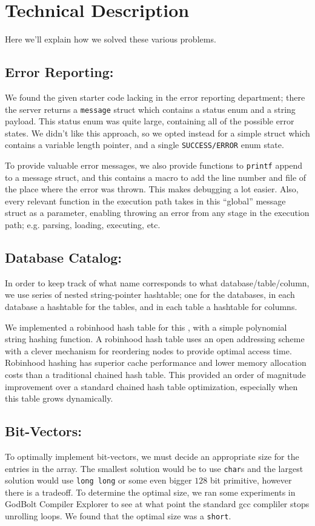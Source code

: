 \documentclass{article}
\begin{document}
\section{Technical Description}

Here we'll explain how we solved these various problems.

\subsection{Error Reporting:}
We found the given starter code lacking in the error reporting department; there the server returns a \texttt{message} struct which contains a status enum and a string payload. This status enum was quite large, containing all of the possible error states. We didn't like this approach, so we opted instead for a simple struct which contains a variable length pointer, and a single \texttt{SUCCESS/ERROR} enum state.

\medskip
To provide valuable error messages, we also provide functions to \texttt{printf} append to a message struct, and this contains a macro to add the line number and file of the place where the error was thrown. This makes debugging a lot easier. Also, every relevant function in the execution path takes in this ``global'' message struct as a parameter, enabling throwing an error from any stage in the execution path; e.g. parsing, loading, executing, etc.

\subsection{Database Catalog:}
In order to keep track of what name corresponds to what database/table/column, we use series of nested string-pointer hashtable; one for the databases, in each database a hashtable for the tables, and in each table a hashtable for columns.

\medskip
We implemented a robinhood hash table for this \cite{hash}, with a simple polynomial string hashing function. A robinhood hash table uses an open addressing scheme with a clever mechanism for reordering nodes to provide optimal access time. Robinhood hashing has superior cache performance and lower memory allocation costs than a traditional chained hash table. This provided an order of magnitude improvement over a standard chained hash table optimization, especially when this table grows dynamically.

\subsection{Bit-Vectors:}
To optimally implement bit-vectors, we must decide an appropriate size for the entries in the array. The smallest solution would be to use \texttt{char}s and the largest solution would use \texttt{long long} or some even bigger $128$ bit primitive, however there is a tradeoff. To determine the optimal size, we ran some experiments in GodBolt Compiler Explorer to see at what point the standard gcc compliler stops unrolling loops. We found that the optimal size was a \texttt{short}. 
\end{document}
